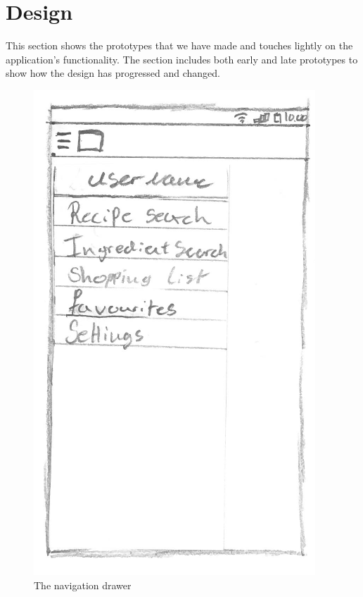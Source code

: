 \section{Design}
This section shows the prototypes that we have made and touches lightly on the application's functionality. The section includes both early and late prototypes to show how the design has progressed and changed. 


\begin{figure}[H]
\begin{minipage}[b]{0.5\columnwidth}
\centering
\includegraphics[width=0.7\columnwidth]{img/prototypes/navigation_drawer.pdf}
\caption{The navigation drawer\label{fig:navdrawer}}
\end{minipage}
\hspace{0.5cm}
\begin{minipage}[b]{0.5\columnwidth}
\centering

\end{minipage}
\end{figure}
